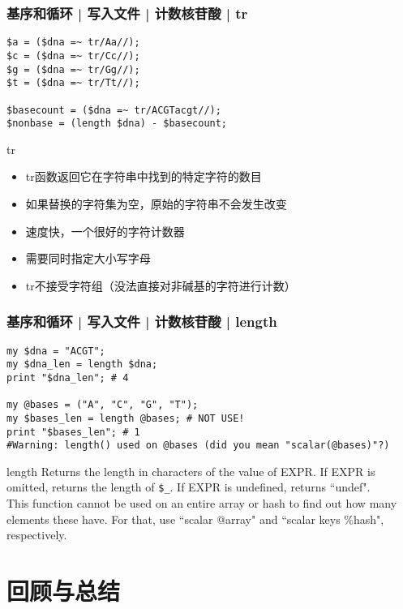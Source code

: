 \begin{frame}[fragile]
  \frametitle{基序和循环 | 写入文件 | 计数核苷酸 | \alert{tr}}
\begin{lstlisting}
$a = ($dna =~ tr/Aa//);
$c = ($dna =~ tr/Cc//);
$g = ($dna =~ tr/Gg//);
$t = ($dna =~ tr/Tt//);

$basecount = ($dna =~ tr/ACGTacgt//);
$nonbase = (length $dna) - $basecount;
\end{lstlisting}
\pause
\begin{block}{tr}
  \begin{itemize}
    \item tr函数返回它在字符串中找到的特定字符的数目
    \item 如果替换的字符集为空，原始的字符串不会发生改变
    \item 速度快，一个很好的字符计数器
    \item 需要同时指定大小写字母
    \item tr不接受字符组（没法直接对非碱基的字符进行计数）
  \end{itemize}
\end{block}
\end{frame}

\begin{frame}[fragile]
  \frametitle{基序和循环 | 写入文件 | 计数核苷酸 | \alert{length}}
\begin{lstlisting}
my $dna = "ACGT";
my $dna_len = length $dna;
print "$dna_len"; # 4

my @bases = ("A", "C", "G", "T");
my $bases_len = length @bases; # NOT USE!
print "$bases_len"; # 1
#Warning: length() used on @bases (did you mean "scalar(@bases)"?)
\end{lstlisting}
\pause
\vspace{-0.5em}
\begin{block}{length}
{\small
Returns the length in characters of the value of EXPR. If EXPR is omitted, returns the length of \verb|$_|. If EXPR is undefined, returns ``undef".\\
\vspace{0.2em}
This function cannot be used on an entire array or hash to find out how many elements these have. For that, use ``\alert{scalar @array}" and ``\alert{scalar keys \%hash}", respectively.
}
\end{block}
\end{frame}

\section{回顾与总结}
